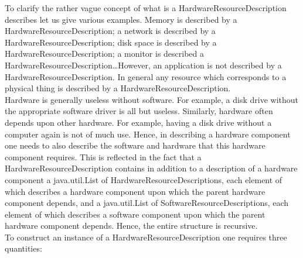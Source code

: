 \documentclass[$Date: 2003/06/26 19:29:31 $]{glabarticle}
\begin{document}
To clarify the rather vague concept of what is a
HardwareResourceDescription describes let us give various
examples. Memory is described by a HardwareResourceDescription; a
network is described by a HardwareResourceDescription; disk space is
described by a HardwareResourceDescription; a monitor is described a
HardwareResourceDescription\ldots However, an application is not
described by a HardwareResourceDescription. In general any resource
which corresponds to a physical thing is described by a
HardwareResourceDescription. \\

Hardware is generally useless without software. For example, a disk
drive without the appropriate software driver is all but
useless. Similarly, hardware often depends upon other hardware. For
example, having a disk drive without a computer again is not of much
use. Hence, in describing a hardware component one needs to also
describe the software and hardware that this hardware component
requires. This is reflected in the fact that a
HardwareResourceDescription contains in addition to a description of a
hardware component a java.util.List of HardwareResourceDescriptions, each
element of which describes a hardware component upon which the parent
hardware component depends, and a java.util.List of
SoftwareResourceDescriptions, each element of which describes a
software component upon which the parent hardware component
depends. Hence, the entire structure is recursive. \\

To construct an instance of a HardwareResourceDescription one requires
three quantities:
\end{document}
